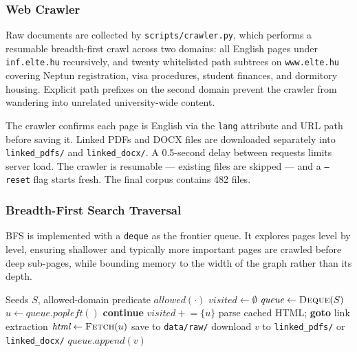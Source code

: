 \subsubsection{Web Crawler}

Raw documents are collected by \texttt{scripts/crawler.py}, which performs a
resumable breadth-first crawl across two domains: all English pages under
\texttt{inf.elte.hu} recursively, and twenty whitelisted path subtrees on
\texttt{www.elte.hu} covering Neptun registration, visa procedures, student
finances, and dormitory housing. Explicit path prefixes on the second domain
prevent the crawler from wandering into unrelated university-wide content.

The crawler confirms each page is English via the \texttt{lang} attribute and
URL path before saving it. Linked PDFs and DOCX files are downloaded separately
into \texttt{linked\_pdfs/} and \texttt{linked\_docx/}. A 0.5-second delay
between requests limits server load. The crawler is resumable — existing files
are skipped — and a \texttt{--reset} flag starts fresh. The final corpus
contains 482 files.

\subsubsection*{Breadth-First Search Traversal}

BFS is implemented with a \texttt{deque} as the frontier queue. It explores
pages level by level, ensuring shallower and typically more important pages are
crawled before deep sub-pages, while bounding memory to the width of the graph
rather than its depth.

\begin{algorithm}[H]
\caption{BFS Web Crawler}
\label{alg:bfs-crawler}
\begin{algorithmic}[1]
\Require Seeds $S$, allowed-domain predicate $\textit{allowed}(\cdot)$
\State $\textit{visited} \gets \emptyset$
\State $\textit{queue} \gets \textsc{Deque}(S)$
    \State $u \gets \textit{queue.popleft}()$
     \textbf{continue} \EndIf
    \State $\textit{visited} \mathrel{+}= \{u\}$
     parse cached HTML; \textbf{goto} link extraction \EndIf
    \State $\textit{html} \gets \textsc{Fetch}(u)$
     save to \texttt{data/raw/} \EndIf
            \State download $v$ to \texttt{linked\_pdfs/} or \texttt{linked\_docx/}
            \State $\textit{queue.append}(v)$
        \EndIf
    \EndFor
\EndWhile
\end{algorithmic}
\end{algorithm}

